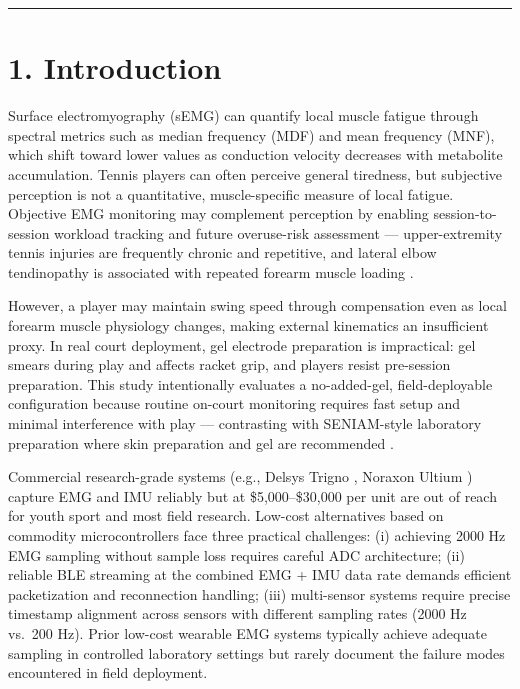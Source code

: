 \documentclass[sensors,article,submit,pdftex,moreauthors]{Definitions/mdpi}
\begin{document}
\begin{center}\rule{0.5\linewidth}{0.5pt}\end{center}

\section{1. Introduction}\label{introduction}

Surface electromyography (sEMG) can quantify local muscle fatigue through spectral metrics
such as median frequency (MDF) and mean frequency (MNF), which shift toward lower values as
conduction velocity decreases with metabolite accumulation. Tennis players can often perceive
general tiredness, but subjective perception is not a quantitative, muscle-specific measure of
local fatigue. Objective EMG monitoring may complement perception by enabling session-to-session
workload tracking and future overuse-risk assessment --- upper-extremity tennis injuries are
frequently chronic and repetitive, and lateral elbow tendinopathy is associated with repeated
forearm muscle loading \citep{aaos2023}.

However, a player may maintain swing speed through compensation even as local forearm muscle
physiology changes, making external kinematics an insufficient proxy. In real court deployment,
gel electrode preparation is impractical: gel smears during play and affects racket grip, and
players resist pre-session preparation. This study intentionally evaluates a no-added-gel,
field-deployable configuration because routine on-court monitoring requires fast setup and
minimal interference with play --- contrasting with SENIAM-style laboratory preparation where
skin preparation and gel are recommended \citep{hermens2000}.

Commercial research-grade systems (e.g., Delsys Trigno \citep{delsys2024}, Noraxon Ultium \citep{noraxon2024}) capture
EMG and IMU reliably but at \$5,000--\$30,000 per unit are out of reach for youth sport and most
field research. Low-cost alternatives based on commodity microcontrollers face three practical
challenges: (i) achieving 2000 Hz EMG sampling without sample loss requires careful ADC
architecture; (ii) reliable BLE streaming at the combined EMG + IMU data rate demands
efficient packetization and reconnection handling; (iii) multi-sensor systems require precise
timestamp alignment across sensors with different sampling rates (2000 Hz vs.~200 Hz).
Prior low-cost wearable EMG systems \citep{cerone2019, lynn2018, yang2024} typically achieve adequate sampling in controlled
laboratory settings but rarely document the failure modes encountered in field deployment.
\end{document}
